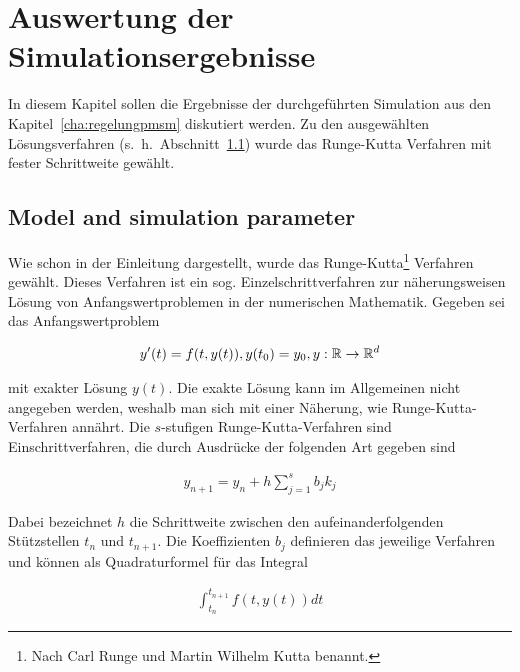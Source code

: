 
\chapter{Auswertung der Simulationsergebnisse}
\label{chap:ergebnisse-foc}

In diesem Kapitel sollen die Ergebnisse der durchgeführten Simulation aus den Kapitel~\ref{cha:regelungpmsm} diskutiert werden.
Zu den ausgewählten Lösungsverfahren (s.~h.~Abschnitt~\ref{sec:parameter}) wurde das Runge-Kutta Verfahren mit fester Schrittweite gewählt.

\section{Model and simulation parameter}\label{sec:parameter}

Wie schon in der Einleitung dargestellt, wurde das Runge-Kutta\footnote{Nach Carl Runge und Martin Wilhelm Kutta benannt.} Verfahren gewählt.
Dieses Verfahren ist ein sog. Einzelschrittverfahren zur näherungsweisen Lösung von Anfangswertproblemen in der numerischen Mathematik.
Gegeben sei das Anfangswertproblem

\begin{align}
	y'(t) = f(t,y(t)), y(t_{\mathrm{0}})=y_{\mathrm{0}}, y: \mathbb{R}\rightarrow\mathbb{R}^{d}
\end{align}

mit exakter Lösung $y(t)$.
Die exakte Lösung kann im Allgemeinen nicht angegeben werden, weshalb man sich mit einer Näherung, wie Runge-Kutta-Verfahren annährt.
Die $s$-stufigen Runge-Kutta-Verfahren sind Einschrittverfahren, die durch Ausdrücke der folgenden Art gegeben sind

\begin{align}
	y_{n+1} = y_n + h \sum_{j=1}^{s}{b_j k_j}
\end{align}

Dabei bezeichnet $h$ die Schrittweite zwischen den aufeinanderfolgenden Stützstellen $t_n$ und $t_{n+1}$.
Die Koeffizienten $b_j$ definieren das jeweilige Verfahren und können als Quadraturformel für das Integral

\begin{align}
	\int_{t_n}^{t_{n+1}}{f(t,y(t))dt}
\end{align}

